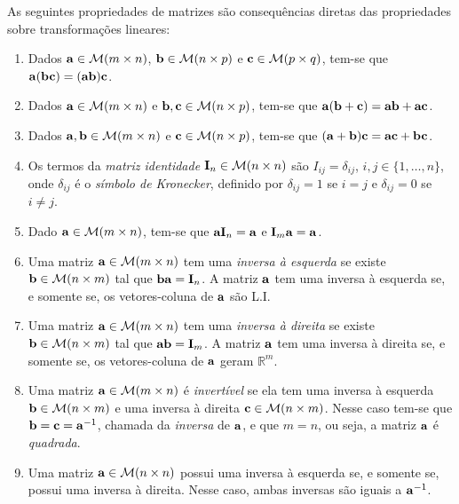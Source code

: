 \documentclass[12pt,a4paper]{article}
\newcommand{\R}{\mathbb{R}}
\theoremstyle{definition}
\begin{document}
As seguintes propriedades de matrizes são consequências diretas das
propriedades sobre transformações lineares:
\begin{enumerate}
\item Dados ${\bf a}\in{\cal M}(m\times n)$,
  ${\bf b}\in{\cal M}(n\times p)$ e ${\bf c}\in{\cal M}(p\times q)$,
  tem-se que ${\bf a}({\bf bc})=({\bf ab}){\bf c}$.
\item Dados ${\bf a}\in{\cal M}(m\times n)$ e
  ${\bf b},{\bf c}\in{\cal M}(n\times p)$, tem-se que
  ${\bf a}({\bf b}+{\bf c})={\bf ab}+{\bf ac}$.
\item Dados ${\bf a},{\bf b}\in{\cal M}(m\times n)$ e
  ${\bf c}\in{\cal M}(n\times p)$, tem-se que
  $({\bf a}+{\bf b}){\bf c}={\bf ac}+{\bf bc}$.
\item Os termos da \textit{matriz identidade}
  ${\bf I}_n\in{\cal M}(n\times n)$ são $I_{ij}=\delta_{ij}$,
  $i,j\in\{1,\ldots,n\}$, onde $\delta_{ij}$ é o \textit{símbolo de
    Kronecker}, definido por $\delta_{ij}=1$ se $i=j$ e
  $\delta_{ij}=0$ se $i\ne j$.
\item Dado ${\bf a}\in{\cal M}(m\times n)$, tem-se que
  ${\bf aI}_n={\bf a}$ e ${\bf I}_m{\bf a}={\bf a}$.
\item Uma matriz ${\bf a}\in{\cal M}(m\times n)$ tem uma
  \textit{inversa à esquerda} se existe
  ${\bf b}\in{\cal M}(n\times m)$ tal que ${\bf ba}={\bf I}_n$. A
  matriz ${\bf a}$ tem uma inversa à esquerda se, e somente se, os
  vetores-coluna de ${\bf a}$ são L.I.
\item Uma matriz ${\bf a}\in{\cal M}(m\times n)$ tem uma
  \textit{inversa à direita} se existe ${\bf b}\in{\cal M}(n\times m)$
  tal que ${\bf ab}={\bf I}_m$. A matriz ${\bf a}$ tem uma inversa à
  direita se, e somente se, os vetores-coluna de ${\bf a}$ geram
  $\R^m$.
\item Uma matriz ${\bf a}\in{\cal M}(m\times n)$ é \textit{invertível}
  se ela tem uma inversa à esquerda ${\bf b}\in{\cal M}(n\times m)$ e
  uma inversa à direita ${\bf c}\in{\cal M}(n\times m)$. Nesse caso
  tem-se que ${\bf b}={\bf c}={\bf a}^{-1}$, chamada da
  \textit{inversa} de ${\bf a}$, e que $m=n$, ou seja, a matriz
  ${\bf a}$ é \textit{quadrada}.
\item Uma matriz ${\bf a}\in {\cal M}(n\times n)$ possui uma inversa à
  esquerda se, e somente se, possui uma inversa à direita. Nesse caso,
  ambas inversas são iguais a ${\bf a}^{-1}$.
\end{enumerate}
\end{document}
